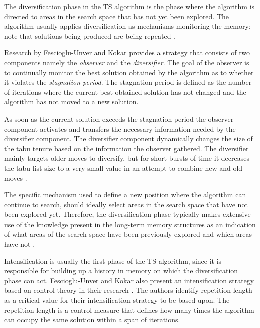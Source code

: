 The diversification phase in the TS algorithm is the phase where the algorithm is directed to areas in the search space that has not yet been explored. The algorithm usually applies diversification as mechanisms monitoring the memory; note that solutions being produced are being repeated \cite{ReactiveTabuVHR,SelfControllingReactiveTabu}. 

Research by Fescioglu-Unver and Kokar \cite{SelfControllingReactiveTabu} provides a strategy that consists of two components namely the \emph{observer} and the \emph{diversifier}. The goal of the observer is to continually monitor the best solution obtained by the algorithm as to whether it violates the \emph{stagnation period}. The stagnation period is defined as the number of iterations where the current best obtained solution has not changed and the algorithm has not moved to a new solution\cite{SelfControllingReactiveTabu}. 

As soon as the current solution exceeds the stagnation period the observer component activates and transfers the necessary information needed by the diversifier component. The diversifier component dynamically changes the size of the tabu tenure based on the information the observer gathered. The diversifier mainly targets older moves to diversify, but for short bursts of time it decreases the tabu list size to a very small value in an attempt to combine new and old moves \cite{SelfControllingReactiveTabu}.

The specific mechanism used to define a new position where the algorithm can continue to search, should ideally select areas in the search space that have not been explored yet. Therefore, the diversification phase typically makes extensive use of the knowledge present in the long-term memory structures as an indication of what areas of the search space have been previously explored and which areas have not \cite{TabuParameterization,TabuCrewSchedulingProblem,NonlinearGlobalTabu,SelfControllingReactiveTabu}.

Intensification is usually the first phase of the TS algorithm, since it is responsible for building up a history in memory on which the diversification phase can act. Fescioglu-Unver and Kokar also present an intensification strategy based on control theory in their research \cite{SelfControllingReactiveTabu}. The authors identify repetition length as a critical value for their intensification strategy to be based upon. The repetition length is a control measure that defines how many times the algorithm can occupy the same solution within a span of iterations.

